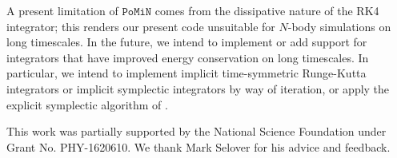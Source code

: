 \documentclass[aps,onecolumn,notitlepage,eqsecnum,nofootinbib,floatfix,superscriptaddress]{revtex4-1}
\newcommand{\codename}{\mathtt{PoMiN}}
\begin{document}
A present limitation of $\codename$ comes from the dissipative nature of the RK4 integrator; this renders our present code unsuitable for $N$-body simulations on long timescales. In the future, we intend to implement or add support for integrators that have improved energy conservation on long timescales. In particular, we intend to implement implicit time-symmetric Runge-Kutta integrators or implicit symplectic integrators by way of iteration, or apply the explicit symplectic algorithm of \cite{Tao2016}. 

\begin{acknowledgments}
This work was partially supported by the National Science Foundation under Grant No. PHY-1620610. We thank Mark Selover for his advice and feedback.
\end{acknowledgments}


\end{document}
